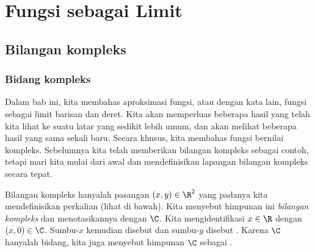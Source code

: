 
\chapter{Fungsi sebagai Limit} \label{approx:chapter}


\section{Bilangan kompleks}
\label{sec:complexnums}



\subsection{Bidang kompleks}

Dalam bab ini, kita membahas aproksimasi fungsi, atau dengan kata lain,
fungsi sebagai limit barisan dan deret.
Kita akan memperluas beberapa hasil yang telah kita lihat ke suatu
latar yang sedikit lebih umum, dan akan melihat beberapa hasil yang sama sekali baru.
Secara khusus, kita membahas fungsi bernilai kompleks.
Sebelumnya kita telah memberikan bilangan kompleks sebagai contoh, tetapi
mari kita mulai dari awal dan mendefinisikan lapangan bilangan kompleks secara tepat.

Bilangan kompleks hanyalah pasangan $(x,y) \in \R^2$ yang padanya kita
mendefinisikan perkalian (lihat di bawah).
Kita menyebut himpunan ini \emph{bilangan kompleks}
dan menotasikannya dengan $\C$.
Kita mengidentifikasi $x \in \R$ dengan $(x,0) \in \C$.
Sumbu-$x$ kemudian disebut \emph{} dan sumbu-$y$ disebut
\emph{}.
Karena $\C$ hanyalah bidang, kita juga menyebut himpunan $\C$ sebagai
\emph{}.

